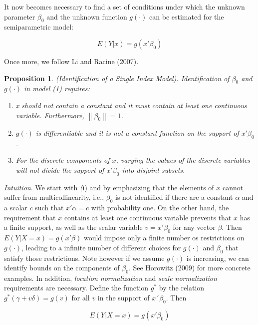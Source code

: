 \documentclass[a4paper]{article}
\newcommand{\norm}[1]{\left\lVert#1\right\rVert}
\begin{document}
It now becomes necessary to find a set of conditions under which the unknown parameter $\beta_0$ and the unknown function $ g(\cdot)$ can be estimated for the semiparametric model:

\[E(Y|x) = g(x'\beta_0) \]

\vspace{5mm} 

Once more, we follow Li and Racine (2007).


\newtheorem{prop}{Proposition}

\begin{prop}
(Identification of a Single Index Model). 
Identification of $\beta_0$ and $g(\cdot)$ in model (1) requires:
\begin{enumerate}[label=(\roman*)]
\item x should not contain a constant and it must contain at least one continuous variable. Furthermore, $\norm{ \beta_0 } = 1$.
\item $g(\cdot)$ is differentiable and it is not a constant function on the support of $x'\beta_0$.
\item For the discrete components of $x$, varying the values of the discrete variables will not divide the support of $x'\beta_0$ into disjoint subsets.
\end{enumerate}
\end{prop}


\textit{Intuition}. We start with \textit(i) and by emphasizing that the elements of $x$ cannot suffer from multicollinearity, i.e., $\beta_0$ is not identified if there are a constant $\alpha$ and a scalar $c$ such that $x'\alpha = c$ with probability one. On the other hand, the requirement that $x$ contains at least one continuous variable prevents that $x$ has a finite support, as well as the scalar variable $ v = x'\beta_0$ for any vector $\beta$. Then $E(Y|X = x) = g(x'\beta)$ would impose only a finite number os restrictions  on $g(\cdot)$, leading to a infinite number of different choices for $g(\cdot)$ and $\beta_0$ that satisfy those restrictions. Note however if we assume $g(\cdot)$ is increasing, we can identify bounds on the components of $\beta_0$. See Horowitz (2009) for more concrete examples. In addition, \textit{location normalization} and \textit{scale normalization} requirements are necessary. Define the function $g^*$ by the relation $g^*(\gamma + v\delta) = g(v)$ for all $v$ in the support of $x´\beta_0$. Then

\begin{equation}
E(Y|X = x) = g(x'\beta_0)
\end{equation}
\end{document}

